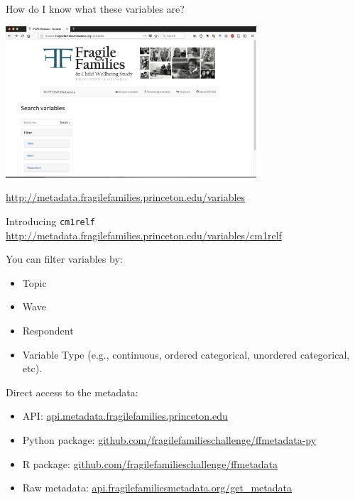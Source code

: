 \documentclass[aspectratio=169]{beamer}
\begin{document}
\begin{frame}

How do I know what these variables are? 

\begin{center}
\includegraphics[width=0.7\textwidth]{figures/ff_metadata_browser}
\end{center}

\vfill

\url{http://metadata.fragilefamilies.princeton.edu/variables}

\end{frame}
\begin{frame}

Introducing \texttt{cm1relf}\\

\url{http://metadata.fragilefamilies.princeton.edu/variables/cm1relf}

\end{frame}
\begin{frame}

You can filter variables by:
\begin{itemize}
\item Topic
\item Wave
\item Respondent
\item Variable Type (e.g., continuous, ordered categorical, unordered categorical, etc).
\end{itemize}

\end{frame}	
\begin{frame}

Direct access to the metadata:
\begin{itemize}
\item API: \url{api.metadata.fragilefamilies.princeton.edu}
\item Python package: \url{github.com/fragilefamilieschallenge/ffmetadata-py}
\item R package: \url{github.com/fragilefamilieschallenge/ffmetadata}
\item Raw metadata: \url{api.fragilefamiliesmetadata.org/get_metadata}
\end{itemize}

\end{frame}
\end{document}
